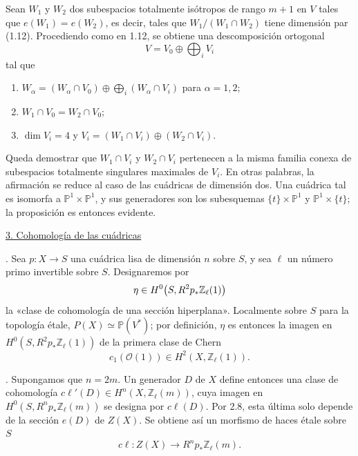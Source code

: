 Sean $W_1$ y $W_2$ dos subespacios totalmente isótropos de rango $m+1$ en
$V$ tales que $e(W_1)=e(W_2)$, es decir, tales que
$W_1/(W_1\cap W_2)$ tiene dimensión par (1.12). Procediendo como en 1.12,
se obtiene una descomposición ortogonal
\begin{equation*}
V=V_0\oplus\bigoplus_i V_i
\end{equation*}
tal que
\begin{enumerate}[label=\alph*),leftmargin=2.5em]
\item $W_\alpha=(W_\alpha\cap V_0)\oplus
  \displaystyle\bigoplus_i(W_\alpha\cap V_i)$ para $\alpha=1,2$;
\item $W_1\cap V_0=W_2\cap V_0$;
\item $\dim V_i=4$ y
  $V_i=(W_1\cap V_i)\oplus(W_2\cap V_i)$.
\end{enumerate}
Queda demostrar que $W_1\cap V_i$ y $W_2\cap V_i$ pertenecen a la misma
familia conexa de subespacios totalmente singulares maximales de $V_i$.
En otras palabras, la afirmación se reduce al caso de las cuádricas de
dimensión dos. Una cuádrica tal es isomorfa a
$\mathbb P^1\times\mathbb P^1$, y sus generadores son los subesquemas
$\{t\}\times\mathbb P^1$ y $\mathbb P^1\times\{t\}$; la proposición es
entonces evidente.

\pageoriginale

\bigskip
\noindent\underline{3. Cohomología de las cuádricas}

\medskip
{}. Sea $p:X\longrightarrow S$ una cuádrica lisa de dimensión
$n$ sobre $S$, y sea $\ell$ un número primo invertible sobre $S$.
Designaremos por
\begin{equation*}
\eta\in H^0\bigl(S,R^{\sisi{1}{2}}p_*\mathbb Z_\ell(1)\bigr)
\end{equation*}
la «clase de cohomología de una sección hiperplana». Localmente sobre $S$
para la topología étale, $P(X)\simeq\mathbb P(V^*)$; por definición,
$\eta$ es entonces la imagen en
$H^0(S,R^2p_*\mathbb Z_\ell(1))$ de la primera clase de Chern
\begin{equation*}
c_1(\mathcal O(1))\in H^2(X,\mathbb Z_\ell(1)).
\end{equation*}


\medskip
{}. Supongamos que $n=2m$. Un generador $D$ de $X$ define
entonces una clase de cohomología
$c\ell'(D)\in H^n(X,\mathbb Z_\ell(m))$, cuya imagen en
$H^0(S,R^np_*\mathbb Z_\ell(m))$ se designa por $c\ell(D)$. Por 2.8,
esta última solo depende de la sección $e(D)$ de $Z(X)$. Se obtiene así un
morfismo de haces étale sobre $S$
\begin{equation}\tag{3.2.1}
c\ell:Z(X)\longrightarrow R^np_*\mathbb Z_\ell(m).
\end{equation}

